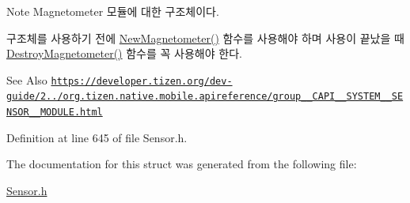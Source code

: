 \begin{DoxyNote}{Note}
Magnetometer 모듈에 대한 구조체이다. \par
 구조체를 사용하기 전에 \hyperlink{Sensor_8h_ac0cc761c2c9b3872743da478e9c8b03a}{New\-Magnetometer()} 함수를 사용해야 하며 사용이 끝났을 때 \hyperlink{Sensor_8h_ade729513094ff7a9a2600b5389e346ac}{Destroy\-Magnetometer()} 함수를 꼭 사용해야 한다. 
\end{DoxyNote}
\begin{DoxySeeAlso}{See Also}
\href{https://developer.tizen.org/dev-guide/2.3.0/org.tizen.native.mobile.apireference/group__CAPI__SYSTEM__SENSOR__MODULE.html}{\tt https\-://developer.\-tizen.\-org/dev-\/guide/2../org.\-tizen.\-native.\-mobile.\-apireference/group\-\_\-\-\_\-\-C\-A\-P\-I\-\_\-\-\_\-\-S\-Y\-S\-T\-E\-M\-\_\-\-\_\-\-S\-E\-N\-S\-O\-R\-\_\-\-\_\-\-M\-O\-D\-U\-L\-E.\-html} 
\end{DoxySeeAlso}


Definition at line 645 of file Sensor.\-h.



The documentation for this struct was generated from the following file\-:\begin{DoxyCompactItemize}
\item 
\hyperlink{Sensor_8h}{Sensor.\-h}\end{DoxyCompactItemize}
